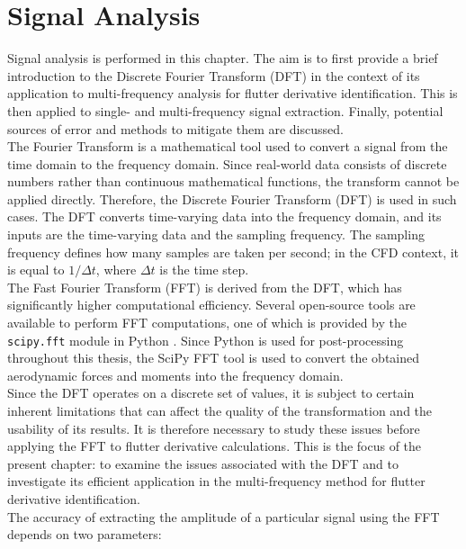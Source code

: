 \documentclass[../main]{subfiles}
\begin{document}
\chapter{Signal Analysis}
\label{cha:signal_analysis}

Signal analysis is performed in this chapter. The aim is to first provide a brief introduction
to the Discrete Fourier Transform (DFT) in the context of its application to multi-frequency analysis
for flutter derivative identification. This is then applied to single- and multi-frequency signal extraction.
Finally, potential sources of error and methods to mitigate them are discussed.\\

The Fourier Transform is a mathematical tool used to convert a signal from the time domain to
the frequency domain. Since real-world data consists of discrete numbers rather than continuous
mathematical functions, the transform cannot be applied directly. Therefore, the Discrete
Fourier Transform (DFT) is used in such cases. The DFT converts time-varying data into the
frequency domain, and its inputs are the time-varying data and the sampling frequency. The
sampling frequency defines how many samples are taken per second; in the CFD context,
it is equal to $1/\Delta t$, where $\Delta t$ is the time step.\\

The Fast Fourier Transform (FFT) is derived from the DFT, which has significantly higher
computational efficiency. Several open-source tools are available to perform FFT computations,
one of which is provided by the \texttt{scipy.fft} module in Python \cite{scipy}. Since Python is used for
post-processing throughout this thesis, the SciPy FFT tool is used to convert the obtained
aerodynamic forces and moments into the frequency domain.\\

Since the DFT operates on a discrete set of values, it is subject to certain inherent
limitations that can affect the quality of the transformation and the usability of its results.
It is therefore necessary to study these issues before applying the FFT to flutter derivative
calculations. This is the focus of the present chapter: to examine the issues associated with
the DFT and to investigate its efficient application in the multi-frequency method for flutter
derivative identification.\\

The accuracy of extracting the amplitude of a particular signal using the FFT depends on two
parameters:
\end{document}
